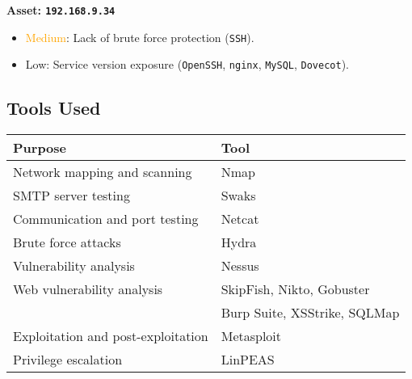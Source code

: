 \documentclass[a4paper,12pt]{article}
\begin{document}
\textbf{Asset: \texttt{192.168.9.34}}  
\begin{itemize}
    \item \textcolor{Orange}{Medium}: Lack of brute force protection (\texttt{SSH}).  
    \item \textcolor{NavyBlue}{Low}: Service version exposure (\texttt{OpenSSH}, \texttt{nginx}, \texttt{MySQL}, \texttt{Dovecot}).  
\end{itemize}

\subsection{Tools Used}
\begin{table}[ht]
    \centering
    \begin{tabular}{ll}
        \toprule
        \rowcolor{gray!20} \textbf{Purpose} & \textbf{Tool} \\
        \midrule
        Network mapping and scanning & Nmap \\
        SMTP server testing & Swaks \\
        Communication and port testing & Netcat \\
        Brute force attacks & Hydra \\
        Vulnerability analysis & Nessus \\
        Web vulnerability analysis & SkipFish, Nikto, Gobuster \\ & Burp Suite, XSStrike, SQLMap \\
        Exploitation and post-exploitation & Metasploit \\
        Privilege escalation & LinPEAS \\
        \bottomrule
    \end{tabular}
\end{table}
\end{document}
